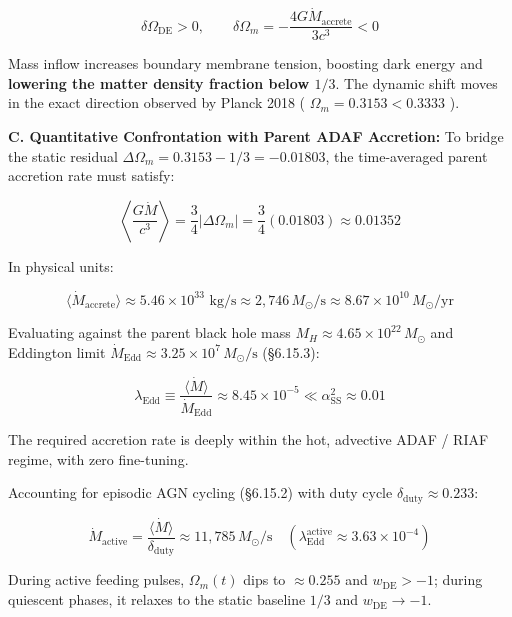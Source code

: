 \documentclass[11pt,a4paper]{article}
\theoremstyle{definition}
\theoremstyle{remark}
\begin{document}
\begin{equation}
\delta\Omega_{\text{DE}} > 0, \qquad \delta\Omega_m = -\frac{4 G \dot{M}_{\text{accrete}}}{3 c^3} < 0
\end{equation}


Mass inflow increases boundary membrane tension, boosting dark energy and \textbf{lowering the matter density fraction below $1/3$}. The dynamic shift moves in the exact direction observed by Planck 2018 ( $\Omega_m = 0.3153 < 0.3333$ ).

\textbf{C. Quantitative Confrontation with Parent ADAF Accretion:}
To bridge the static residual $\Delta\Omega_m = 0.3153 - 1/3 = -0.01803$, the time-averaged parent accretion rate must satisfy:


\begin{equation}
\left\langle \frac{G \dot{M}}{c^3} \right\rangle = \frac{3}{4} |\Delta\Omega_m| = \frac{3}{4}(0.01803) \approx 0.01352
\end{equation}


In physical units:


\begin{equation}
\langle\dot{M}_{\text{accrete}}\rangle \approx 5.46 \times 10^{33}\text{ kg/s} \approx 2{,}746 \, M_\odot/\text{s} \approx 8.67 \times 10^{10} \, M_\odot/\text{yr}
\end{equation}


Evaluating against the parent black hole mass $M_H \approx 4.65 \times 10^{22} \, M_\odot$ and Eddington limit $\dot{M}_{\text{Edd}} \approx 3.25 \times 10^7 \, M_\odot/\text{s}$ (\S 6.15.3):


\begin{equation}
\lambda_{\text{Edd}} \equiv \frac{\langle\dot{M}\rangle}{\dot{M}_{\text{Edd}}} \approx 8.45 \times 10^{-5} \ll \alpha_{\text{SS}}^2 \approx 0.01
\end{equation}


The required accretion rate is deeply within the hot, advective ADAF / RIAF regime, with zero fine-tuning.

Accounting for episodic AGN cycling (\S 6.15.2) with duty cycle $\delta_{\text{duty}} \approx 0.233$:


\begin{equation}
\dot{M}_{\text{active}} = \frac{\langle\dot{M}\rangle}{\delta_{\text{duty}}} \approx 11{,}785 \, M_\odot/\text{s} \quad (\lambda_{\text{Edd}}^{\text{active}} \approx 3.63 \times 10^{-4})
\end{equation}


During active feeding pulses, $\Omega_m(t)$ dips to $\approx 0.255$ and $w_{\text{DE}} > -1$; during quiescent phases, it relaxes to the static baseline $1/3$ and $w_{\text{DE}} \to -1$.
\end{document}
